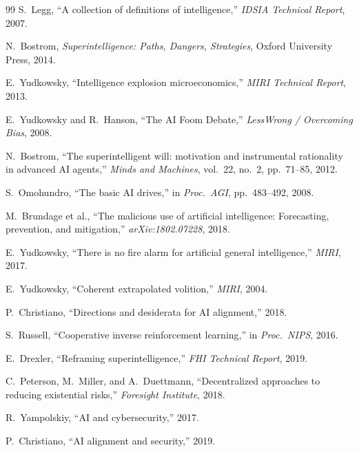 \documentclass[11pt,twocolumn]{article}
\begin{document}
\begin{thebibliography}{99}
\small
{} S.~Legg, ``A collection of definitions of
intelligence,'' \textit{IDSIA Technical Report}, 2007.

 N.~Bostrom, \textit{Superintelligence:
Paths, Dangers, Strategies}, Oxford University Press, 2014.

 E.~Yudkowsky, ``Intelligence explosion
microeconomics,'' \textit{MIRI Technical Report}, 2013.

 E.~Yudkowsky and R.~Hanson, ``The AI Foom
Debate,'' \textit{LessWrong / Overcoming Bias}, 2008.

 N.~Bostrom, ``The superintelligent will:
motivation and instrumental rationality in advanced AI agents,'' \textit{Minds
and Machines}, vol.~22, no.~2, pp.~71--85, 2012.

 S.~Omohundro, ``The basic AI drives,'' in
\textit{Proc.\ AGI}, pp.~483--492, 2008.

 M.~Brundage et al., ``The malicious use of
artificial intelligence: Forecasting, prevention, and mitigation,''
\textit{arXiv:1802.07228}, 2018.

 E.~Yudkowsky, ``There is no fire alarm for
artificial general intelligence,'' \textit{MIRI}, 2017.

 E.~Yudkowsky, ``Coherent extrapolated volition,''
\textit{MIRI}, 2004.

 P.~Christiano, ``Directions and desiderata
for AI alignment,'' 2018.

 S.~Russell, ``Cooperative inverse
reinforcement learning,'' in \textit{Proc.\ NIPS}, 2016.

 E.~Drexler, ``Reframing superintelligence,''
\textit{FHI Technical Report}, 2019.

 C.~Peterson, M.~Miller, and A.~Duettmann,
``Decentralized approaches to reducing existential risks,'' \textit{Foresight
Institute}, 2018.

 R.~Yampolskiy, ``AI and cybersecurity,''
2017.

 P.~Christiano, ``AI alignment and security,''
2019.


\end{thebibliography}
\end{document}
